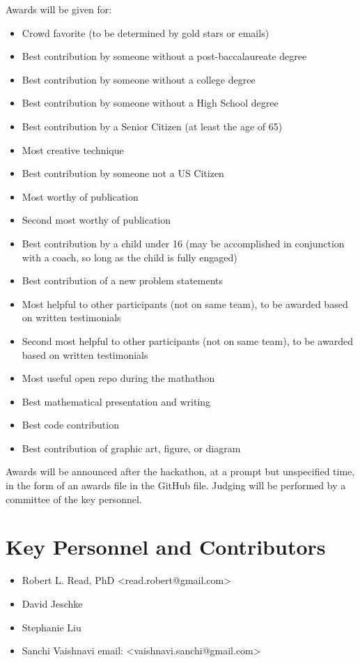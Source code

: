 \documentclass[11pt]{article}
\begin{document}
Awards will be given for:
\begin{itemize}
\item Crowd favorite (to be determined by gold stars or emails)
\item Best contribution by someone without a post-baccalaureate degree
\item Best contribution by someone without a college degree
\item Best contribution by someone without a High School degree
\item Best contribution by a Senior Citizen (at least the age of 65)
\item Most creative technique
\item Best contribution by someone not a US Citizen
\item Most worthy of publication
\item Second most worthy of publication
\item Best contribution by a child under 16 (may be accomplished in conjunction with a coach, so long as the child is fully engaged)
\item Best contribution of a new problem statements
\item Most helpful to other participants (not on same team), to be awarded based on written testimonials
\item Second most helpful to other participants (not on same team), to be awarded based on written testimonials
\item Most useful open repo during the mathathon
\item Best mathematical presentation and writing
\item Best code contribution
\item Best contribution of graphic art, figure, or diagram
\end{itemize}

Awards will be announced after the hackathon, at a prompt but unspecified time, in the form of an
awards file in the GitHub file. Judging will be performed by a committee of the key personnel.

\section{Key Personnel and Contributors}

\begin{itemize}
\item Robert L. Read, PhD  <read.robert@gmail.com>
\item David Jeschke
\item Stephanie Liu
\item Sanchi Vaishnavi email: <vaishnavi.sanchi@gmail.com>
\end{itemize}
\end{document}
